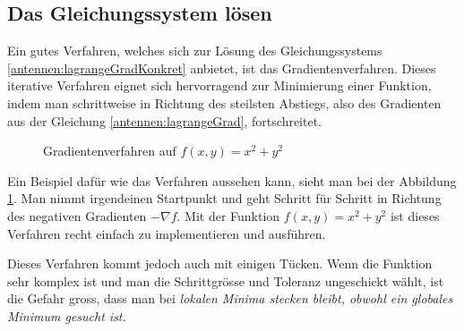 \subsection{Das Gleichungssystem lösen\label{antennen:glSysSolve}}

Ein gutes Verfahren, welches sich zur Lösung des Gleichungssystems 
\eqref{antennen:lagrangeGradKonkret} anbietet, ist das Gradientenverfahren. Dieses 
iterative Verfahren eignet sich hervorragend zur Minimierung 
einer Funktion, indem man schrittweise in Richtung des steilsten Abstiegs,
also des Gradienten aus der Gleichung \eqref{antennen:lagrangeGrad},
fortschreitet. 

\begin{figure}
	\centering
	\caption{Gradientenverfahren auf $f(x,y)=x^2+y^2$}
	\label{antennen:gradverfahrenBSP}
\end{figure}

Ein Beispiel dafür wie das Verfahren aussehen kann, sieht man bei der 
Abbildung \ref{antennen:gradverfahrenBSP}. Man nimmt irgendeinen Startpunkt
und geht Schritt für Schritt in Richtung des negativen Gradienten $-\nabla f$.
Mit der Funktion $f(x,y)=x^2+y^2$ ist dieses Verfahren recht einfach zu 
implementieren und ausführen.

Dieses Verfahren kommt jedoch auch mit einigen Tücken. Wenn die Funktion sehr komplex ist
und man die Schrittgrösse und Toleranz ungeschickt wählt, ist die Gefahr gross, dass man 
bei \em lokalen \em Minima stecken bleibt, obwohl ein \em globales \em Minimum gesucht ist.

